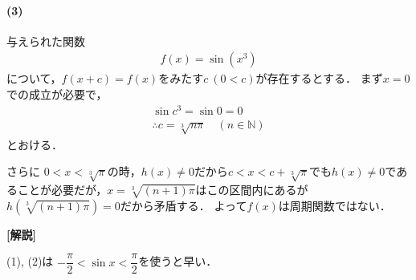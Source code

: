 \documentclass[../../main.tex]{subfiles}
\begin{document}
\paragraph{(3)}

与えられた関数
\begin{align}
  f(x) = \sin (x^3)
\end{align}
について，$f(x+c) = f(x)$をみたす$c \ (0 < c)$が存在するとする．
まず$x=0$での成立が必要で，
\begin{align}
  \sin c^3 = \sin 0 = 0 \\
  \therefore
  c = \sqrt[3]{n\pi} \quad (n \in \mathbb{N})
\end{align}
とおける．

さらに $0 < x < \sqrt[3]{\pi}$の時，$h(x) \neq 0$だから$c < x < c + \sqrt[3]{\pi}$でも$h(x) \neq 0$であることが必要だが，$x = \sqrt[3]{(n+1)\pi}$はこの区間内にあるが$h(\sqrt[3]{(n+1)\pi}) = 0$だから矛盾する．
よって$f(x)$は周期関数ではない．

{\bf [解説]}

(1), (2)は $-\dfrac{\pi}{2} < \sin x < \dfrac{\pi}{2}$を使うと早い．
\end{document}
